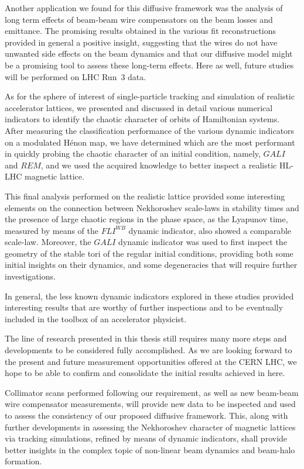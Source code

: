 Another application we found for this diffusive framework was the analysis of long term effects of beam-beam wire compensators on the beam losses and emittance. The promising results obtained in the various fit reconstructions provided in general a positive insight, suggesting that the wires do not have unwanted side effects on the beam dynamics and that our diffusive model might be a promising tool to assess these long-term effects. Here as well, future studies will be performed on LHC Run~3 data.

As for the sphere of interest of single-particle tracking and simulation of realistic accelerator lattices, we presented and discussed in detail various numerical indicators to identify the chaotic character of orbits of Hamiltonian systems. After measuring the classification performance of the various dynamic indicators on a modulated Hénon map, we have determined which are the most performant in quickly probing the chaotic character of an initial condition, namely, $GALI$ and $REM$, and we used the acquired knowledge to better inspect a realistic HL-LHC magnetic lattice.

This final analysis performed on the realistic lattice provided some interesting elements on the connection between Nekhoroshev scale-laws in stability times and the presence of large chaotic regions in the phase space, as the Lyapunov time, measured by means of the $FLI^{WB}$ dynamic indicator, also showed a comparable scale-law. Moreover, the $GALI$ dynamic indicator was used to first inspect the geometry of the stable tori of the regular initial conditions, providing both some initial insights on their dynamics, and some degeneracies that will require further investigations.

In general, the less known dynamic indicators explored in these studies provided interesting results that are worthy of further inspections and to be eventually included in the toolbox of an accelerator physicist.

The line of research presented in this thesis still requires many more steps and developments to be considered fully accomplished. As we are looking forward to the present and future measurement opportunities offered at the CERN LHC, we hope to be able to confirm and consolidate the initial results achieved in here.

Collimator scans performed following our requirement, as well as new beam-beam wire compensator measurements, will provide new data to be inspected and used to assess the consistency of our proposed diffusive framework. This, along with further developments in assessing the Nekhoroshev character of magnetic lattices via tracking simulations, refined by means of dynamic indicators, shall provide better insights in the complex topic of non-linear beam dynamics and beam-halo formation.


